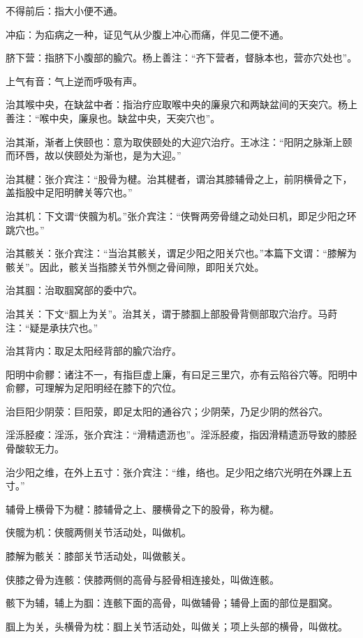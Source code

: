 \documentclass[12pt]{ctexbook}%
\begin{document}
\begin{jiaozhu}
	\item 不得前后：指大小便不通。
	\item 冲疝：为疝病之一种，证见气从少腹上冲心而痛，伴见二便不通。
	\item 脐下营：指脐下小腹部的腧穴。杨上善注：“齐下营者，督脉本也，营亦穴处也”。
	\item 上气有音：气上逆而呼吸有声。
	\item 治其喉中央，在缺盆中者：指治疗应取喉中央的廉泉穴和两缺盆间的天突穴。杨上善注：“喉中央，廉泉也。缺盆中央，天突穴也”。
	\item 治其渐，渐者上侠颐也：意为取侠颐处的大迎穴治疗。王冰注：“阳阴之脉渐上颐而环唇，故以侠颐处为渐也，是为大迎。”
	\item 治其楗：张介宾注：“股骨为楗。治其楗者，谓治其膝辅骨之上，前阴横骨之下，盖指股中足阳明髀关等穴也。”
	\item 治其机：下文谓“侠髖为机。”张介宾注：“侠臀两旁骨缝之动处曰机，即足少阳之环跳穴也。”
	\item 治其骸关：张介宾注：“当治其骸关，谓足少阳之阳关穴也。”本篇下文谓：“膝解为骸关”。因此，骸关当指膝关节外恻之骨间隙，即阳关穴处。
	\item 治其腘：治取腘窝部的委中穴。
	\item 治其关：下文“腘上为关”。治其关，谓于膝腘上部股骨背侧部取穴治疗。马莳注：“疑是承扶穴也。”
	\item 治其背内：取足太阳经背部的腧穴治疗。
	\item 阳明中俞髎：诸注不一，有指巨虚上廉，有曰足三里穴，亦有云陷谷穴等。阳明中俞髎，可理解为足阳明经在膝下的穴位。
	\item 治巨阳少阴荥：巨阳荥，即足太阳的通谷穴；少阴荣，乃足少阴的然谷穴。
	\item 淫泺胫痠：淫泺，张介宾注：“滑精遗沥也”。淫泺胫痠，指因滑精遗沥导致的膝胫骨酸软无力。
	\item 治少阳之维，在外上五寸：张介宾注：“维，络也。足少阳之络穴光明在外踝上五寸。”
	\item 辅骨上横骨下为楗：膝辅骨之上、腰横骨之下的股骨，称为楗。
	\item 侠髋为机：侠髋两侧关节活动处，叫做机。
	\item 膝解为骸关：膝部关节活动处，叫做骸关。
	\item 侠膝之骨为连骸：侠膝两侧的高骨与胫骨相连接处，叫做连骸。
	\item 骸下为辅，辅上为腘：连骸下面的高骨，叫做辅骨；辅骨上面的部位是腘窝。
	\item 腘上为关，头横骨为枕：腘上关节活动处，叫做关；项上头部的横骨，叫做枕。
\end{jiaozhu}
\end{document}
